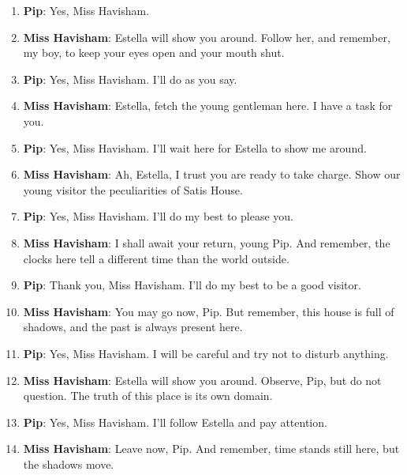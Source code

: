 \documentclass[10pt]{article}
\begin{document}
\begin{enumerate}\setlength{\itemsep}{1pt}\small

\item \textbf{Pip}: Yes, Miss Havisham.

\item \textbf{Miss Havisham}: Estella will show you around. Follow her, and remember, my boy, to keep your eyes open and your mouth shut.

\item \textbf{Pip}: Yes, Miss Havisham. I'll do as you say.

\item \textbf{Miss Havisham}: Estella, fetch the young gentleman here. I have a task for you.

\item \textbf{Pip}: Yes, Miss Havisham. I'll wait here for Estella to show me around.

\item \textbf{Miss Havisham}: Ah, Estella, I trust you are ready to take charge. Show our young visitor the peculiarities of Satis House.

\item \textbf{Pip}: Yes, Miss Havisham. I'll do my best to please you.

\item \textbf{Miss Havisham}: I shall await your return, young Pip. And remember, the clocks here tell a different time than the world outside.

\item \textbf{Pip}: Thank you, Miss Havisham. I'll do my best to be a good visitor.

\item \textbf{Miss Havisham}: You may go now, Pip. But remember, this house is full of shadows, and the past is always present here.

\item \textbf{Pip}: Yes, Miss Havisham. I will be careful and try not to disturb anything.

\item \textbf{Miss Havisham}: Estella will show you around. Observe, Pip, but do not question. The truth of this place is its own domain.

\item \textbf{Pip}: Yes, Miss Havisham. I'll follow Estella and pay attention.

\item \textbf{Miss Havisham}: Leave now, Pip. And remember, time stands still here, but the shadows move.


\end{enumerate}
\end{document}
